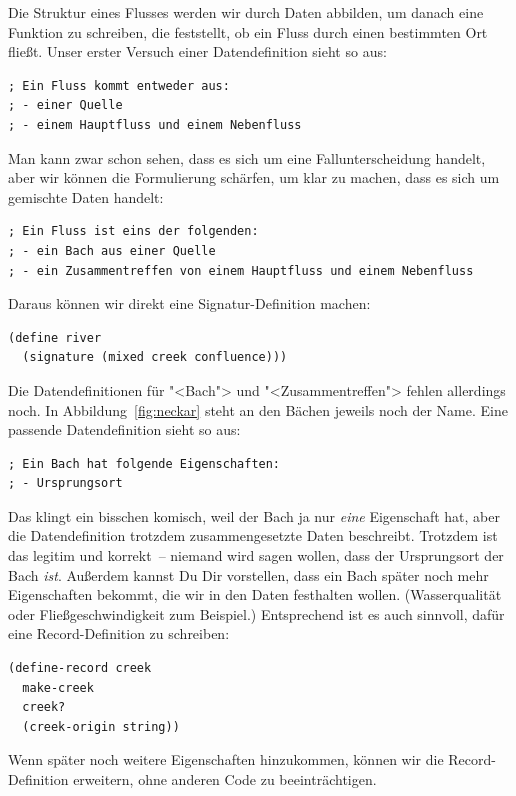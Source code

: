 Die Struktur eines Flusses werden wir durch Daten abbilden, um danach
eine Funktion zu schreiben, die feststellt, ob ein Fluss durch einen
bestimmten Ort fließt.  Unser erster Versuch einer Datendefinition
sieht so aus:
%
\begin{lstlisting}
; Ein Fluss kommt entweder aus:
; - einer Quelle
; - einem Hauptfluss und einem Nebenfluss
\end{lstlisting}
%
Man kann zwar schon sehen, dass es sich um eine Fallunterscheidung
handelt, aber wir können die Formulierung schärfen, um klar zu machen,
dass es sich um gemischte Daten handelt:
%
\begin{lstlisting}
; Ein Fluss ist eins der folgenden:
; - ein Bach aus einer Quelle
; - ein Zusammentreffen von einem Hauptfluss und einem Nebenfluss
\end{lstlisting}
%
Daraus können wir direkt eine Signatur-Definition machen:
%
\begin{lstlisting}
(define river
  (signature (mixed creek confluence)))
\end{lstlisting}
%
Die Datendefinitionen für "<Bach"> und "<Zusammentreffen"> fehlen
allerdings noch.  In Abbildung~\ref{fig:neckar} steht an den Bächen
jeweils noch der Name.  Eine passende Datendefinition sieht so aus:
%
\begin{lstlisting}
; Ein Bach hat folgende Eigenschaften:
; - Ursprungsort
\end{lstlisting}
%
Das klingt ein bisschen komisch, weil der Bach ja nur \emph{eine}
Eigenschaft hat, aber die Datendefinition trotzdem zusammengesetzte
Daten beschreibt.  Trotzdem ist das legitim und korrekt~-- niemand
wird sagen wollen, dass der Ursprungsort der Bach \emph{ist}.
Außerdem kannst Du Dir vorstellen, dass ein Bach später noch mehr
Eigenschaften bekommt, die wir in den Daten festhalten
wollen. (Wasserqualität oder Fließgeschwindigkeit zum Beispiel.)
Entsprechend ist es auch sinnvoll, dafür eine Record-Definition zu
schreiben:
%
\begin{lstlisting}
(define-record creek
  make-creek
  creek?
  (creek-origin string))
\end{lstlisting}
%
Wenn später noch weitere Eigenschaften hinzukommen, können wir die
Record-Definition erweitern, ohne anderen Code zu beeinträchtigen.

